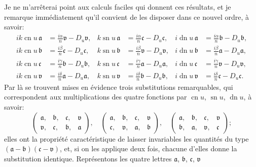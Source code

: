 \documentclass[11pt,leqno,oneside,letterpaper]{book}[2005/09/16]
\DeclareMathOperator{\sn}{sn}
\DeclareMathOperator{\cn}{cn}
\DeclareMathOperator{\dn}{dn}
\begin{document}
Je ne m'arr\^eterai point aux calculs faciles qui donnent ces r\'esultats,
et je remarque imm\'ediatement qu'il convient de les disposer dans ce nouvel
ordre, \`a savoir:
\begin{align*}
  ik\cn u \,\mathfrak{a}
&= \frac{i\alpha}{n}\mathfrak{v} - D_u\mathfrak{v},
&  k\sn u \,\mathfrak{a}
&= \frac{i\alpha}{n}\mathfrak{c} - D_u\mathfrak{c},
& i \dn u \,\mathfrak{a}
&= \frac{i\alpha}{n}\mathfrak{b} - D_u\mathfrak{b},
\\
  ik\cn u \,\mathfrak{b}
&= \frac{i\beta}{n}\mathfrak{c} - D_u\mathfrak{c},
&  k\sn u \,\mathfrak{b}
&= \frac{i\beta}{n}\mathfrak{v} - D_u\mathfrak{v},
& i \dn u \,\mathfrak{b}
&= \frac{i\beta}{n}\mathfrak{a} - D_u\mathfrak{a},
\\
  ik\cn u \,\mathfrak{c}
&= \frac{i\gamma}{n}\mathfrak{b} - D_u\mathfrak{b},
&  k\sn u \,\mathfrak{c}
&= \frac{i\gamma}{n}\mathfrak{a} - D_u\mathfrak{a},
& i \dn u \,\mathfrak{c}
&= \frac{i\gamma}{n}\mathfrak{v} - D_u\mathfrak{v},
\\
  ik\cn u \,\mathfrak{v}
&= \frac{i\delta}{n}\mathfrak{a} - D_u\mathfrak{a},
&  k\sn u \,\mathfrak{v}
&= \frac{i\delta}{n}\mathfrak{b} - D_u\mathfrak{b},
& i \dn u \,\mathfrak{v}
&= \frac{i\delta}{n}\mathfrak{c} - D_u\mathfrak{c}.
\end{align*}
Par l\`a se trouvent mises en \'evidence trois substitutions remarquables, qui
correspondent aux multiplications des quatre fonctions par $\cn u$, $\sn u$, $\dn u$,
\`a savoir:
\[
\begin{pmatrix}
\mathfrak{a}, & \mathfrak{b}, & \mathfrak{c}, & \mathfrak{v} \\
\mathfrak{v}, & \mathfrak{c}, & \mathfrak{b}, & \mathfrak{a}
\end{pmatrix},
\quad
\begin{pmatrix}
\mathfrak{a}, & \mathfrak{b}, & \mathfrak{c}, & \mathfrak{v} \\
\mathfrak{c}, & \mathfrak{v}, & \mathfrak{a}, & \mathfrak{b}
\end{pmatrix},
\quad
\begin{pmatrix}
\mathfrak{a}, & \mathfrak{b}, & \mathfrak{c}, & \mathfrak{v} \\
\mathfrak{b}, & \mathfrak{a}, & \mathfrak{v}, & \mathfrak{c}
\end{pmatrix};
\]
elles ont la propri\'et\'e caract\'eristique de laisser invariables les quantit\'es
du type $(\mathfrak{a}-\mathfrak{b}) (\mathfrak{c}-\mathfrak{v})$,
et, si on les applique deux fois, chacune d'elles
donne la substitution identique. Repr\'esentons les quatre lettres $\mathfrak{a}$, $\mathfrak{b}$, $\mathfrak{c}$, $\mathfrak{v}$
\end{document}
